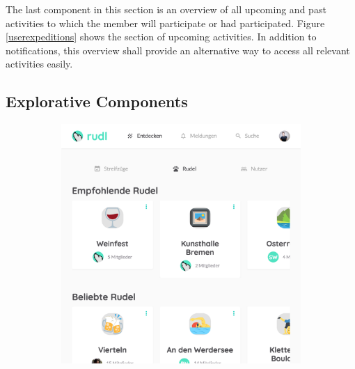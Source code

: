 \documentclass[12pt,numbers=noenddot,parskip,bibliography=totocnumbered,listof=totocnumbered]{scrreprt}
\begin{document}
The last component in this section is an overview of all upcoming and past activities to which the member will participate or had participated. Figure \ref{userexpeditions} shows the section of upcoming activities. In addition to notifications, this overview shall provide an alternative way to access all relevant activities easily.

\subsection{Explorative Components}
\begin{figure}
\begin{subfigure}[t]{0.45\textwidth}
\centering
\includegraphics[width=\linewidth]{explorerudel.png}
\caption{}
\label{explorerudel}
\end{subfigure}
\hfill
\begin{subfigure}[t]{0.45\textwidth}
\centering

\end{subfigure}
\end{figure}
\end{document}
